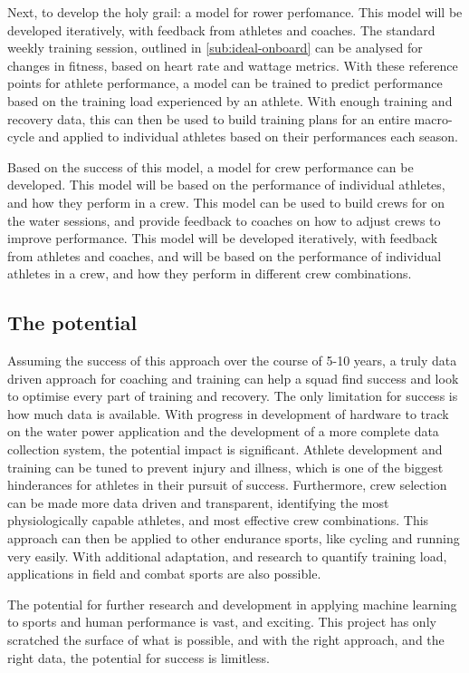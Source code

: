 Next, to develop the holy grail: a model for rower perfomance. This model will be developed iteratively, with feedback from athletes and coaches. The standard weekly training session, outlined in \autoref{sub:ideal-onboard} can be analysed for changes in fitness, based on heart rate and wattage metrics. With these reference points for athlete performance, a model can be trained to predict performance based on the training load experienced by an athlete. With enough training and recovery data, this can then be used to build training plans for an entire macro-cycle and applied to individual athletes based on their performances each season. 

Based on the success of this model, a model for crew performance can be developed. This model will be based on the performance of individual athletes, and how they perform in a crew. This model can be used to build crews for on the water sessions, and provide feedback to coaches on how to adjust crews to improve performance. This model will be developed iteratively, with feedback from athletes and coaches, and will be based on the performance of individual athletes in a crew, and how they perform in different crew combinations.

\subsection{The potential}
Assuming the success of this approach over the course of 5-10 years, a truly data driven approach for coaching and training can help a squad find success and look to optimise every part of training and recovery. The only limitation for success is how much data is available. With progress in development of hardware to track on the water power application and the development of a more complete data collection system, the potential impact is significant. Athlete development and training can be tuned to prevent injury and illness, which is one of the biggest hinderances for athletes in their pursuit of success. Furthermore, crew selection can be made more data driven and transparent, identifying the most physiologically capable athletes, and most effective crew combinations. This approach can then be applied to other endurance sports, like cycling and running very easily. With additional adaptation, and research to quantify training load, applications in field and combat sports are also possible.

The potential for further research and development in applying machine learning to sports and human performance is vast, and exciting. This project has only scratched the surface of what is possible, and with the right approach, and the right data, the potential for success is limitless.